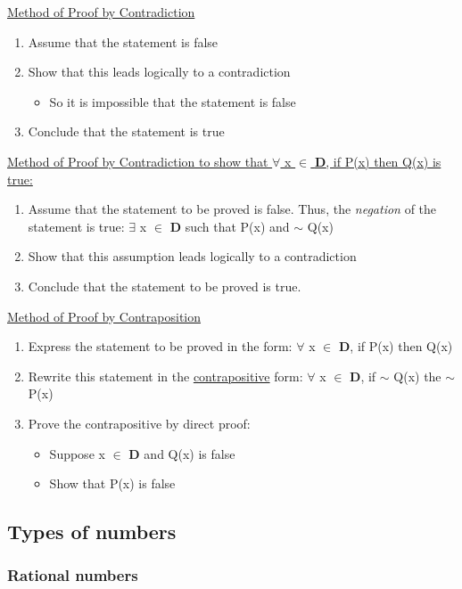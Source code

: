 \documentclass{article}
\begin{document}
\underline{Method of Proof by Contradiction}

\begin{enumerate}
\item Assume that the statement is false
\item Show that this leads logically to a contradiction
\begin{itemize}
\item So it is impossible that the statement is false
\end{itemize}
\item Conclude that the statement is true
\end{enumerate}

\underline{Method of Proof by Contradiction to show that $\forall$ x $\in$ \textbf{D}, if P(x) then Q(x) is true:}

\begin{enumerate}
\item Assume that the statement to be proved is false. Thus, the \textit{negation} of the statement is true: $\exists$ x $\in$ \textbf{D} such that P(x) and $\sim$ Q(x)
\item Show that this assumption leads logically to a contradiction
\item Conclude that the statement to be proved is true.
\end{enumerate}

\underline{Method of Proof by Contraposition}

\begin{enumerate}
\item Express the statement to be proved in the form: $\forall$ x $\in$ \textbf{D}, if P(x) then Q(x)
\item Rewrite this statement in the \underline{contrapositive} form: $\forall$ x $\in$ \textbf{D}, if $\sim$ Q(x) the $\sim$ P(x)
\item Prove the contrapositive by direct proof:
\begin{itemize}
\item Suppose x $\in$ \textbf{D} and Q(x) is false
\item Show that P(x) is false
\end{itemize}
\end{enumerate}

\subsection{Types of numbers}

\subsubsection{Rational numbers}
\end{document}

